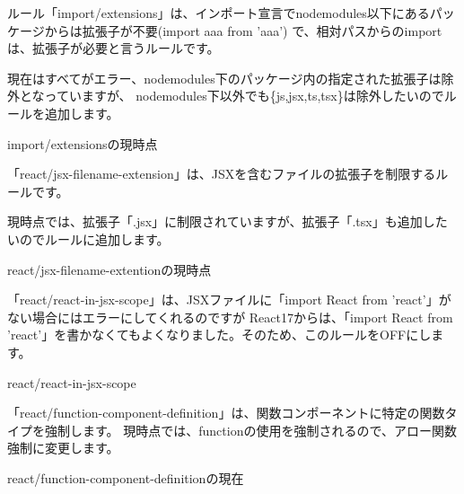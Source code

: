 ルール「import/extensions」は、インポート宣言でnode\textunderscore{}modules以下にあるパッケージからは拡張子が不要(import aaa from 'aaa')
で、相対パスからのimportは、拡張子が必要と言うルールです。

現在はすべてがエラー、node\textunderscore{}modules下のパッケージ内の指定された拡張子は除外となっていますが、
node\textunderscore{}modules下以外でも\{js,jsx,ts,tsx\}は除外したいのでルールを追加します。

\def\startercodeblockfontsize{}
\begin{starterprogram}[]{import/extensionsの現時点}\end{starterprogram}

「react/jsx{-}filename{-}extension」は、JSXを含むファイルの拡張子を制限するルールです。

現時点では、拡張子「.jsx」に制限されていますが、拡張子「.tsx」も追加したいのでルールに追加します。

\def\startercodeblockfontsize{}
\begin{starterprogram}[]{react/jsx{-}filename{-}extentionの現時点}\end{starterprogram}

「react/react{-}in{-}jsx{-}scope」は、JSXファイルに「import React from 'react'」がない場合にはエラーにしてくれるのですが
React17からは、「import React from 'react'」を書かなくてもよくなりました。そのため、このルールをOFFにします。

\def\startercodeblockfontsize{}
\begin{starterprogram}[]{react/react{-}in{-}jsx{-}scope}\end{starterprogram}

「react/function{-}component{-}definition」は、関数コンポーネントに特定の関数タイプを強制します。
現時点では、functionの使用を強制されるので、アロー関数強制に変更します。

\def\startercodeblockfontsize{}
\begin{starterprogram}[]{react/function{-}component{-}definitionの現在}\end{starterprogram}

